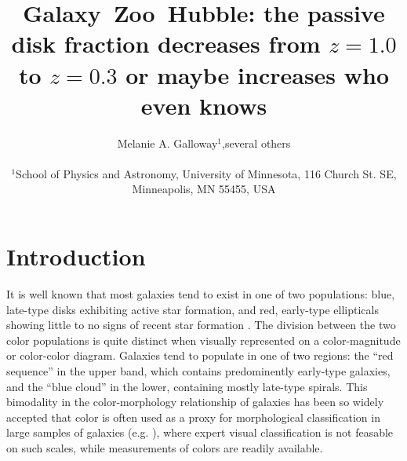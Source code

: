 \documentclass[useAMS,usenatbib]{mn2e}
\begin{document}
\title[Galaxy~Zoo: passive disk fraction]{Galaxy~Zoo~Hubble: the passive disk fraction decreases from $z=1.0$ to $z=0.3$ or maybe increases who even knows}
\author[Galloway et~al.]{\parbox[t]{16cm}{Melanie A. Galloway$^1$,several others
\vspace{0.1in} }\\
$^{1}$School of Physics and Astronomy, University of Minnesota, 116 Church St. SE, Minneapolis, MN 55455, USA\\
   }
\maketitle

\begin{abstract}


\end{abstract}

\section{Introduction}
\label{sec:Intro}

It is well known that most galaxies tend to exist in one of two populations: blue, late-type disks exhibiting active star formation, and red, early-type ellipticals showing little to no signs of recent star formation \citep{Strateva2001,Baldry2004,Correa2017}. The division between the two color populations is quite distinct when visually represented on a color-magnitude or color-color diagram. Galaxies tend to populate in one of two regions: the ``red sequence'' in the upper band, which contains predominently early-type galaxies, and the ``blue cloud'' in the lower, containing mostly late-type spirals. This bimodality in the color-morphology relationship of galaxies has been so widely accepted that color is often used as a proxy for morphological classification in large samples of galaxies (e.g. \citet{Cooray2005,Lee2007,Salimbeni2008,Simon2009}), where expert visual classification is not feasable on such scales, while measurements of colors are readily available. 
\end{document}
